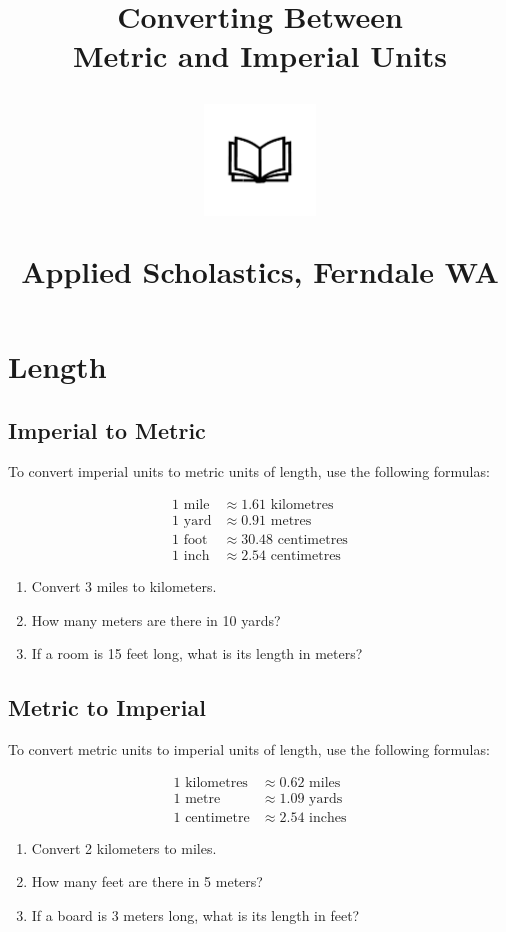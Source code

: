 \documentclass{article}
\author{}
\date{}
\title{\textbf{Converting Between\\Metric and Imperial Units}
\vspace{28pt}
\begin{center}
\includegraphics[width=4em]{ApS_logo.png}
\end{center}

\begin{normalsize}
Applied Scholastics, Ferndale WA
\end{normalsize}}
\begin{document}
\maketitle

\section*{Length}

\subsection*{Imperial to Metric}
To convert imperial units to metric units of length, use the following formulas:

\begin{align*}
1 \text{ mile} &\approx 1.61 \text{ kilometres} \\
1 \text{ yard} &\approx 0.91 \text{ metres} \\
1 \text{ foot} &\approx 30.48 \text{ centimetres} \\
1 \text{ inch} &\approx 2.54 \text{ centimetres}
\end{align*}

\begin{enumerate}
    \item Convert 3 miles to kilometers.
    \item How many meters are there in 10 yards?
    \item If a room is 15 feet long, what is its length in meters?
\end{enumerate}

\subsection*{Metric to Imperial}
To convert metric units to imperial units of length, use the following formulas:

\begin{align*}
1 \text{ kilometres} &\approx 0.62 \text{ miles} \\
1 \text{ metre} &\approx 1.09 \text{ yards} \\
1 \text{ centimetre} &\approx 2.54 \text{ inches}
\end{align*}

\begin{enumerate}
    \item Convert 2 kilometers to miles.
    \item How many feet are there in 5 meters?
    \item If a board is 3 meters long, what is its length in feet?
\end{enumerate}
\end{document}
